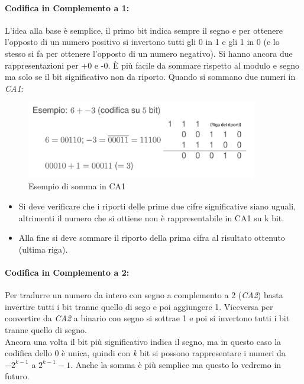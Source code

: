 \paragraph*{Codifica in Complemento a 1:} L’idea alla base è semplice, il primo bit indica sempre il segno e per ottenere l’opposto di un numero positivo si invertono tutti gli 0 in 1 e gli 1 in 0 (e lo stesso si fa per ottenere l’opposto di un numero negativo). Si hanno ancora due rappresentazioni per +0 e -0. È più facile da sommare rispetto al modulo e segno ma solo se il bit significativo non da riporto.
Quando si sommano due numeri in \textit{CA1}:
\begin{figure}[H]
	\centering
	\includegraphics[width=0.9\textwidth,keepaspectratio]{images/Somma-CA1.png}
	\caption{Esempio di somma in CA1}
\end{figure}
\begin{itemize}[noitemsep]
\item Si deve verificare che i riporti delle prime due cifre significative siano uguali, altrimenti il numero che si ottiene non è rappresentabile in CA1 su k bit.
\item Alla fine si deve sommare il riporto della prima cifra al risultato ottenuto (ultima riga).
\end{itemize}
\paragraph*{Codifica in Complemento a 2:} Per tradurre un numero da intero con segno a complemento a 2 (\textit{CA2}) basta invertire tutti i bit tranne quello di sego e poi aggiungere 1. Viceversa per convertire da \textit{CA2} a binario con segno si sottrae 1 e poi si invertono tutti i bit tranne quello di segno. \\
Ancora una volta il bit più significativo indica il segno, ma in questo caso la codifica dello 0 è unica, quindi con \textit{k} bit si possono rappresentare i numeri da $-2^{k-1}$ a $2^{k-1}-1$. Anche la somma è più semplice ma questo lo vedremo in futuro.

